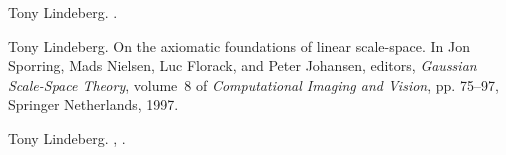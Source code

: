 \documentclass[pdflatex,11pt]{aghdpl}
\begin{document}
\begin{thebibliography}{10}
Tony Lindeberg.
.

Tony Lindeberg.
\newblock On the axiomatic foundations of linear scale-space.
\newblock In Jon Sporring, Mads Nielsen, Luc Florack, and Peter Johansen,
  editors, {\em Gaussian Scale-Space Theory}, volume~8 of {\em Computational
  Imaging and Vision}, pp. 75--97, Springer Netherlands, 1997.

Tony Lindeberg.
,
.

\end{thebibliography}

%

\appendix






\end{document}
